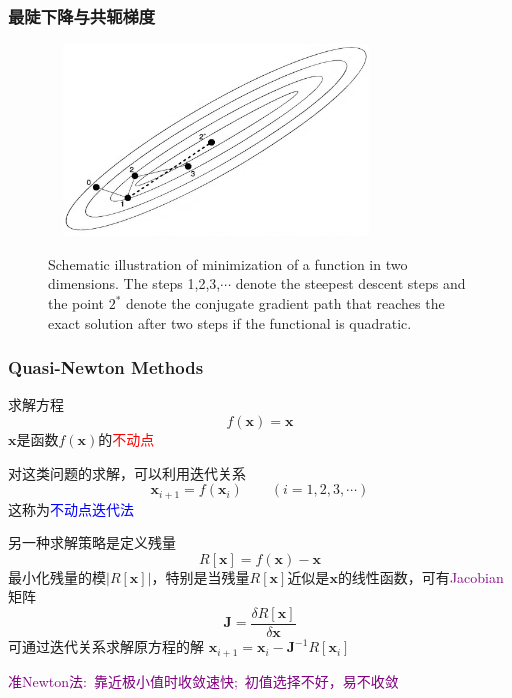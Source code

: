 \documentclass[cjk,slidestop,compress,mathserif,blue]{beamer}
\begin{document}
\frame
{
	\frametitle{最陡下降与共轭梯度}
\begin{figure}[h!]
\centering
\includegraphics[height=2.0in,width=3.5in,viewport=0 0 950 590,clip]{Figures/OP_descent_CG.png}
\label{decent_CG}
\caption{\tiny \textrm{Schematic illustration of minimization of a function in two dimensions. The steps 1,2,3,$\cdots$ denote the steepest descent steps and the point $2^{\ast}$ denote the conjugate gradient path that reaches the exact solution after two steps if the functional is quadratic.}}%
\end{figure}
}

\frame
{
	\frametitle{\textrm{Quasi-Newton Methods}}
	求解方程
	\begin{displaymath}
		f(\mathbf{x})=\mathbf{x}
	\end{displaymath}
	$\mathbf{x}$是函数$f(\mathbf{x})$的\textcolor{red}{不动点}
	
	对这类问题的求解，可以利用迭代关系
	\begin{displaymath}
		\mathbf{x}_{i+1}=f(\mathbf{x}_i)\qquad (i=1,2,3,\cdots)
	\end{displaymath}
	这称为\textcolor{blue}{不动点迭代法}

	另一种求解策略是定义残量
	\begin{displaymath}
		R[\mathbf{x}]=f(\mathbf{x})-\mathbf{x}
	\end{displaymath}
	最小化残量的模$|R[\mathbf{x}]|$，特别是当残量$R[\mathbf{x}]$近似是$\mathbf{x}$的线性函数，可有\textcolor{purple}{Jacobian}矩阵
	\begin{displaymath}
		\mathbf{J}=\dfrac{\delta R[\mathbf{x}]}{\delta\mathbf{x}}
	\end{displaymath}
	可通过迭代关系求解原方程的解
		$\mathbf{x}_{i+1}=\mathbf{x}_{i}-\mathbf{J}^{-1}R[\mathbf{x}_{i}]$

	\textcolor{purple}{准\textrm{Newton}法:~靠近极小值时收敛速快;~初值选择不好，易不收敛}
}
\end{document}
